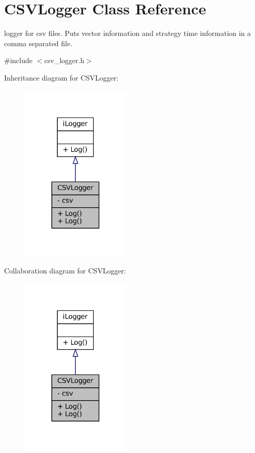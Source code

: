 \hypertarget{classCSVLogger}{}\section{C\+S\+V\+Logger Class Reference}
\label{classCSVLogger}


logger for csv files. Puts vector information and strategy time information in a comma separated file.  




{\ttfamily \#include $<$csv\+\_\+logger.\+h$>$}



Inheritance diagram for C\+S\+V\+Logger\+:\nopagebreak
\begin{figure}[H]
\begin{center}
\leavevmode
\includegraphics[width=149pt]{classCSVLogger__inherit__graph}
\end{center}
\end{figure}


Collaboration diagram for C\+S\+V\+Logger\+:\nopagebreak
\begin{figure}[H]
\begin{center}
\leavevmode
\includegraphics[width=149pt]{classCSVLogger__coll__graph}
\end{center}
\end{figure}
